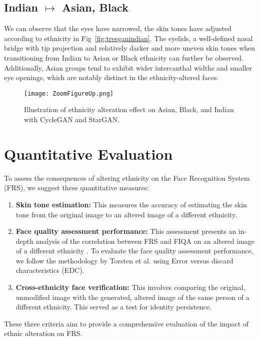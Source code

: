 {	\subsection{Indian $\mapsto$ Asian, Black}
	We can observe that the eyes have narrowed, the skin tones have adjusted according to ethnicity in Fig~\ref{fig:treeganindian}. The eyelids, a well-defined nasal bridge with tip projection and relatively darker and more uneven skin tones when transitioning from Indian to Asian or Black ethnicity can further be observed. Additionally, Asian groups tend to exhibit wider intercanthal widths and smaller eye openings, which are notably distinct in the ethnicity-altered faces.
	

	
	\begin{figure}
		\centering
		\texttt{[image: ZoomFigureUp.png]}
		\caption{Illustration of ethnicity alteration effect on Asian, Black, and Indian with CycleGAN and StarGAN.}
		\label{fig:zoomfigure}
	\end{figure} 





 





	\section{Quantitative Evaluation}\label{sec:quantitative}
	
	
	To assess the consequences of altering ethnicity on the Face Recognition System (FRS), we suggest three quantitative measures:
\begin{enumerate}
    \item \textbf{Skin tone estimation:} This measures the accuracy of estimating the skin tone from the original image to an altered image of a different ethnicity.
    \item \textbf{Face quality assessment performance:} This assessment presents an in-depth analysis of the correlation between FRS and FIQA on an altered image of a different ethnicity \cite{PraveenISO}. To evaluate the face quality assessment performance, we follow the methodology by Torsten et al. \cite{Torsten2022} using  Error versus discard characteristics (EDC).
    \item  \textbf{Cross-ethnicity face verification:} This involves comparing the original, unmodified image with the generated, altered image of the same person of a different ethnicity. This served as a test for identity persistence.
\end{enumerate}
These three criteria aim to provide a comprehensive evaluation of the impact of ethnic alteration on FRS.


}
